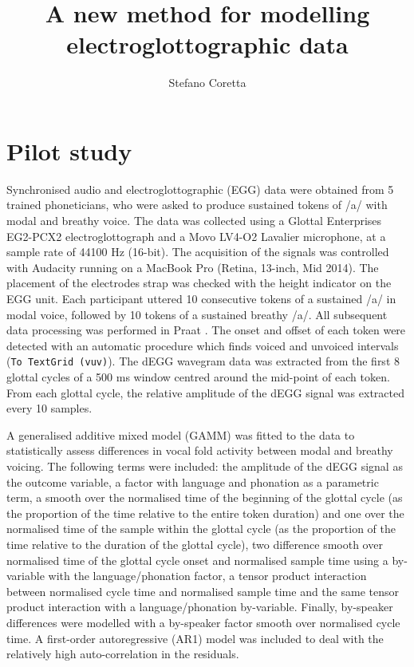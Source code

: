 \documentclass[12pt,a4paper,]{article}
\title{A new method for modelling electroglottographic data}
\author{Stefano Coretta}
\date{}
\begin{document}
\maketitle

\hypertarget{pilot-study}{%
\section{Pilot study}\label{pilot-study}}

Synchronised audio and electroglottographic (EGG) data were obtained
from 5 trained phoneticians, who were asked to produce sustained tokens
of /a/ with modal and breathy voice. The data was collected using a
Glottal Enterprises EG2-PCX2 electroglottograph and a Movo LV4-O2
Lavalier microphone, at a sample rate of 44100 Hz (16-bit). The
acquisition of the signals was controlled with Audacity running on a
MacBook Pro (Retina, 13-inch, Mid 2014). The placement of the electrodes
strap was checked with the height indicator on the EGG unit. Each
participant uttered 10 consecutive tokens of a sustained /a/ in modal
voice, followed by 10 tokens of a sustained breathy /a/. All subsequent
data processing was performed in Praat \citep{boersma2018}. The onset
and offset of each token were detected with an automatic procedure which
finds voiced and unvoiced intervals (\texttt{To\ TextGrid\ (vuv)}). The
dEGG wavegram data was extracted from the first 8 glottal cycles of a
500 ms window centred around the mid-point of each token. From each
glottal cycle, the relative amplitude of the dEGG signal was extracted
every 10 samples.

A generalised additive mixed model (GAMM) was fitted to the data to
statistically assess differences in vocal fold activity between modal
and breathy voicing. The following terms were included: the amplitude of
the dEGG signal as the outcome variable, a factor with language and
phonation as a parametric term, a smooth over the normalised time of the
beginning of the glottal cycle (as the proportion of the time relative
to the entire token duration) and one over the normalised time of the
sample within the glottal cycle (as the proportion of the time relative
to the duration of the glottal cycle), two difference smooth over
normalised time of the glottal cycle onset and normalised sample time
using a by-variable with the language/phonation factor, a tensor product
interaction between normalised cycle time and normalised sample time and
the same tensor product interaction with a language/phonation
by-variable. Finally, by-speaker differences were modelled with a
by-speaker factor smooth over normalised cycle time. A first-order
autoregressive (AR1) model was included to deal with the relatively high
auto-correlation in the residuals.
\end{document}
